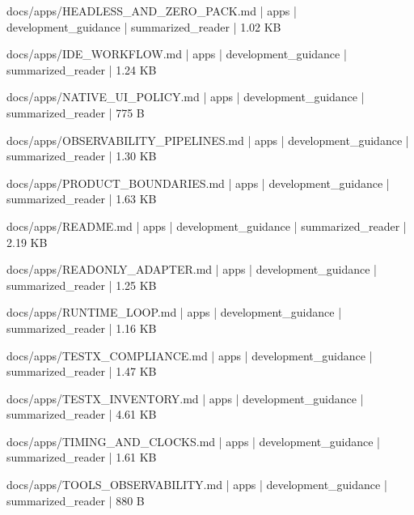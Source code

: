 \documentclass[11pt,a4paper]{report}
\begin{document}
{\small\ttfamily\raggedright docs/\allowbreak{}apps/\allowbreak{}HEADLESS\_AND\_ZERO\_PACK.\allowbreak{}md | apps | development\_guidance | summarized\_reader | 1.\allowbreak{}02 KB\par}
{\small\ttfamily\raggedright docs/\allowbreak{}apps/\allowbreak{}IDE\_WORKFLOW.\allowbreak{}md | apps | development\_guidance | summarized\_reader | 1.\allowbreak{}24 KB\par}
{\small\ttfamily\raggedright docs/\allowbreak{}apps/\allowbreak{}NATIVE\_UI\_POLICY.\allowbreak{}md | apps | development\_guidance | summarized\_reader | 775 B\par}
{\small\ttfamily\raggedright docs/\allowbreak{}apps/\allowbreak{}OBSERVABILITY\_PIPELINES.\allowbreak{}md | apps | development\_guidance | summarized\_reader | 1.\allowbreak{}30 KB\par}
{\small\ttfamily\raggedright docs/\allowbreak{}apps/\allowbreak{}PRODUCT\_BOUNDARIES.\allowbreak{}md | apps | development\_guidance | summarized\_reader | 1.\allowbreak{}63 KB\par}
{\small\ttfamily\raggedright docs/\allowbreak{}apps/\allowbreak{}README.\allowbreak{}md | apps | development\_guidance | summarized\_reader | 2.\allowbreak{}19 KB\par}
{\small\ttfamily\raggedright docs/\allowbreak{}apps/\allowbreak{}READONLY\_ADAPTER.\allowbreak{}md | apps | development\_guidance | summarized\_reader | 1.\allowbreak{}25 KB\par}
{\small\ttfamily\raggedright docs/\allowbreak{}apps/\allowbreak{}RUNTIME\_LOOP.\allowbreak{}md | apps | development\_guidance | summarized\_reader | 1.\allowbreak{}16 KB\par}
{\small\ttfamily\raggedright docs/\allowbreak{}apps/\allowbreak{}TESTX\_COMPLIANCE.\allowbreak{}md | apps | development\_guidance | summarized\_reader | 1.\allowbreak{}47 KB\par}
{\small\ttfamily\raggedright docs/\allowbreak{}apps/\allowbreak{}TESTX\_INVENTORY.\allowbreak{}md | apps | development\_guidance | summarized\_reader | 4.\allowbreak{}61 KB\par}
{\small\ttfamily\raggedright docs/\allowbreak{}apps/\allowbreak{}TIMING\_AND\_CLOCKS.\allowbreak{}md | apps | development\_guidance | summarized\_reader | 1.\allowbreak{}61 KB\par}
{\small\ttfamily\raggedright docs/\allowbreak{}apps/\allowbreak{}TOOLS\_OBSERVABILITY.\allowbreak{}md | apps | development\_guidance | summarized\_reader | 880 B\par}
\end{document}
